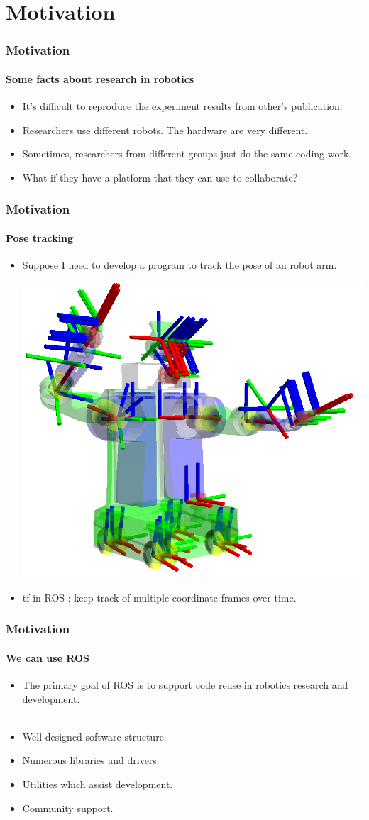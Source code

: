 \documentclass{beamer}
\begin{document}
\section{Motivation}
\begin{frame}
\frametitle{Motivation}
\framesubtitle{Some facts about research in robotics}

\begin{itemize}
  \item It's difficult to reproduce the experiment results from other's publication.
  \item Researchers use different robots. The hardware are very different.
  \item Sometimes, researchers from different groups just do the same coding work.
  \item What if they have a platform that they can use to collaborate?
\end{itemize}
\end{frame}

\begin{frame}
\frametitle{Motivation}
\framesubtitle{Pose tracking}

\begin{itemize}
  \item Suppose I need to develop a program to track the pose of an robot arm.
  \begin{center}
    \includegraphics[width=.4\textwidth]{tf_pr2}
  \end{center}
  \item tf in ROS : keep track of multiple coordinate frames over time.
\end{itemize}
\end{frame}

\begin{frame}
\frametitle{Motivation}
\framesubtitle{We can use ROS}

\begin{itemize}
  \item The primary goal of ROS is to support code reuse in robotics research and development.
  \\ ~  
  \item Well-designed software structure.
  \item Numerous libraries and drivers.
  \item Utilities which assist development.
  \item Community support.
\end{itemize}
\end{frame}
\end{document}
